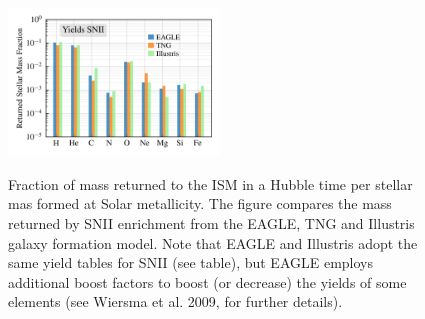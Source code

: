 \documentclass[11pt,a4paper,fleqn,usenatbib,twocolumn]{mnras}
\begin{document}
\begin{figure} 
\begin{center}
\includegraphics[angle=0,width=0.5\textwidth]{../figures/Comparison_SNIIYield_tables_NoCOLIBRE.png}\\
\caption{Fraction of mass returned to the ISM in a Hubble time per stellar mas formed at Solar metallicity. The figure compares the mass returned by SNII enrichment from the EAGLE, TNG and Illustris galaxy formation model. Note that EAGLE and Illustris adopt the same yield tables for SNII (see table), but EAGLE employs additional boost factors to boost (or decrease) the yields of some elements (see Wiersma et al. 2009, for further details).}
\label{SNIIyields}
\end{center}
\end{figure}



%
%
\end{document}
